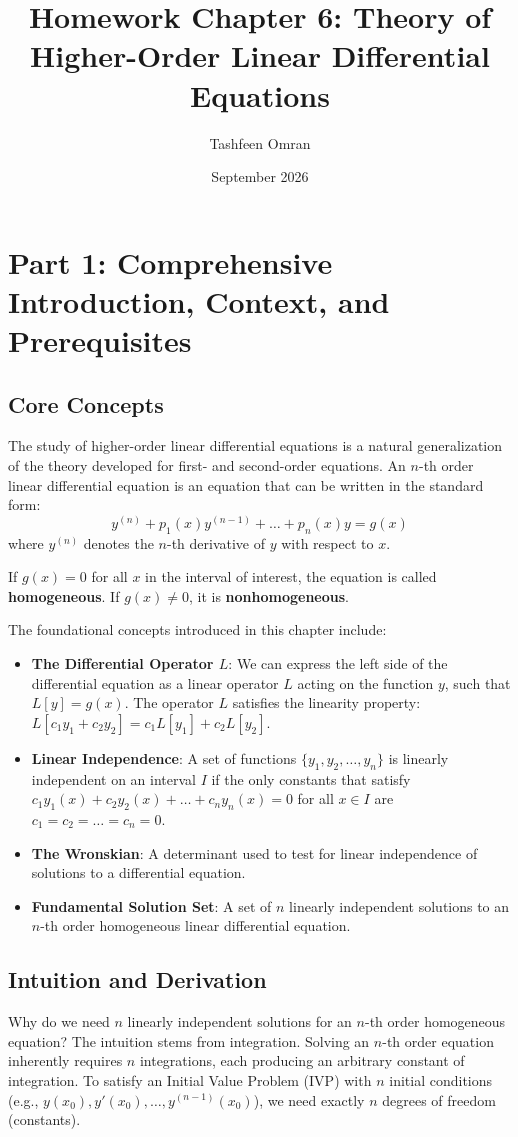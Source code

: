 \documentclass[11pt,letterpaper]{article}
\title{\textbf{Homework Chapter 6: Theory of Higher-Order Linear Differential Equations}}
\author{Tashfeen Omran}
\date{September 2026}
\begin{document}
\maketitle
\tableofcontents
\newpage

\section{Part 1: Comprehensive Introduction, Context, and Prerequisites}

\subsection{Core Concepts}
The study of higher-order linear differential equations is a natural generalization of the theory developed for first- and second-order equations. An $n$-th order linear differential equation is an equation that can be written in the standard form:
\[ y^{(n)} + p_1(x)y^{(n-1)} + \dots + p_n(x)y = g(x) \]
where $y^{(n)}$ denotes the $n$-th derivative of $y$ with respect to $x$. 

If $g(x) = 0$ for all $x$ in the interval of interest, the equation is called \textbf{homogeneous}. If $g(x) \neq 0$, it is \textbf{nonhomogeneous}. 

The foundational concepts introduced in this chapter include:
\begin{itemize}
    \item \textbf{The Differential Operator $L$}: We can express the left side of the differential equation as a linear operator $L$ acting on the function $y$, such that $L[y] = g(x)$. The operator $L$ satisfies the linearity property: $L[c_1 y_1 + c_2 y_2] = c_1 L[y_1] + c_2 L[y_2]$.
    \item \textbf{Linear Independence}: A set of functions $\{y_1, y_2, \dots, y_n\}$ is linearly independent on an interval $I$ if the only constants that satisfy $c_1 y_1(x) + c_2 y_2(x) + \dots + c_n y_n(x) = 0$ for all $x \in I$ are $c_1 = c_2 = \dots = c_n = 0$.
    \item \textbf{The Wronskian}: A determinant used to test for linear independence of solutions to a differential equation.
    \item \textbf{Fundamental Solution Set}: A set of $n$ linearly independent solutions to an $n$-th order homogeneous linear differential equation.
\end{itemize}

\subsection{Intuition and Derivation}
Why do we need $n$ linearly independent solutions for an $n$-th order homogeneous equation? The intuition stems from integration. Solving an $n$-th order equation inherently requires $n$ integrations, each producing an arbitrary constant of integration. To satisfy an Initial Value Problem (IVP) with $n$ initial conditions (e.g., $y(x_0), y'(x_0), \dots, y^{(n-1)}(x_0)$), we need exactly $n$ degrees of freedom (constants). 
\end{document}
